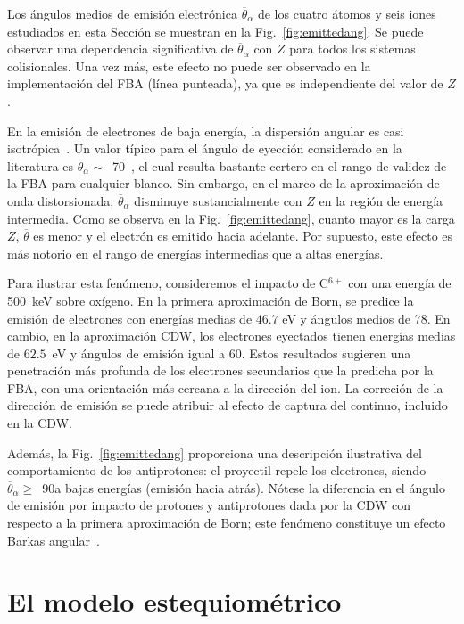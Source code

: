 Los ángulos medios de emisión electrónica $\overline{\theta}_{\alpha}$ 
de los cuatro átomos y seis iones estudiados en esta Sección se muestran 
en la Fig.~\ref{fig:emittedang}. Se puede observar una dependencia 
significativa de $\overline{\theta}_{\alpha}$ con $Z$ para todos los 
sistemas colisionales. Una vez más, este efecto no puede ser observado 
en la implementación del FBA (línea punteada), ya que es independiente 
del valor de $Z$.

En la emisión de electrones de baja energía, la dispersión angular es 
casi isotrópica~\cite{Rudd:92}. Un valor típico para el ángulo de 
eyección considerado en la literatura es 
$\overline{\theta}_{\alpha}\sim$~70\textdegree~\cite{Surdutovic:18}, el 
cual resulta bastante certero en el rango de validez de la FBA para 
cualquier blanco. Sin embargo, en el marco de la aproximación de onda 
distorsionada, $\overline{\theta}_{\alpha}$ disminuye sustancialmente 
con $Z$ en la región de energía intermedia. Como se observa en la 
Fig.~\ref{fig:emittedang}, cuanto mayor es la carga $Z$,
$\overline{\theta}$ es menor y el electrón es emitido hacia adelante. 
Por supuesto, este efecto es más notorio en el rango de energías 
intermedias que a altas energías.

Para ilustrar esta fenómeno, consideremos el impacto de C$^{6+}$ con una 
energía de 500~keV sobre oxígeno. En la primera aproximación de Born, se
predice la emisión de electrones con energías medias de $46.7$ eV y 
ángulos medios de 78\textdegree. En cambio, en la aproximación CDW, los 
electrones eyectados tienen energías medias de $62.5$~eV y ángulos de 
emisión igual a 60\textdegree. Estos resultados sugieren una penetración 
más profunda de los electrones secundarios que la predicha por la FBA, 
con una orientación más cercana a la dirección del ion. La correción de 
la dirección de emisión se puede atribuir al efecto de captura del 
continuo, incluido en la CDW.

Además, la Fig.~\ref{fig:emittedang} proporciona una descripción 
ilustrativa del comportamiento de los antiprotones: el proyectil repele 
los electrones, siendo $\overline{\theta}_{\alpha}\ge$~90\textdegree a 
bajas energías (emisión hacia atrás). Nótese la diferencia en el ángulo 
de emisión por impacto de protones y antiprotones dada por la CDW 
con respecto a la primera aproximación de Born; este fenómeno constituye 
un efecto Barkas angular~\cite{Sigmud:03}.

\section{El modelo estequiométrico}
\label{sec:SSM}

